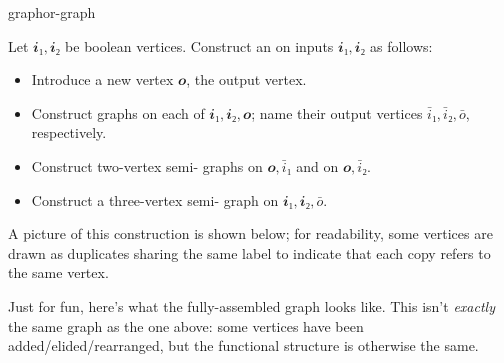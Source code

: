 \begin{definition}{\OR{} graph}{or-graph}

  Let \(𝒊₁,𝒊₂\) be boolean vertices.  Construct an  on inputs
  \(𝒊₁,𝒊₂\) as follows:
  \begin{itemize}[nosep]
    \item Introduce a new vertex \(𝒐\), the output vertex.
    \item Construct \NOT{} graphs on each of \(𝒊₁,𝒊₂,𝒐\); name their output
      vertices \(\bar i₁,\bar i₂,\bar o\), respectively.
    \item Construct two-vertex semi-\OR{} graphs on \(𝒐,\bar i₁\) and on
      \(𝒐,\bar i₂\).
    \item Construct a three-vertex semi-\OR{} graph on \(𝒊₁,𝒊₂,\bar o\).
  \end{itemize}

  A picture of this construction is shown below; for readability, some vertices
  are drawn as duplicates sharing the same label to indicate that each copy
  refers to the same vertex.
  \begin{center}
  \end{center}

  \begin{aside}
    Just for fun, here's what the fully-assembled \OR{} graph looks like.  This
    isn't \emph{exactly} the same graph as the one above: some 
    vertices have been added/elided/rearranged, but the functional structure is
    otherwise the same.

    \begin{center}

    \end{center}
  \end{aside}

\end{definition}

